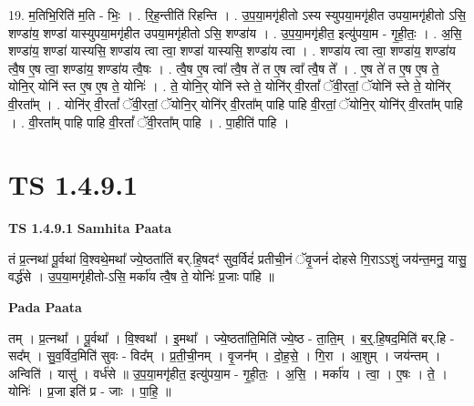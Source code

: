 \documentclass[17pt]{extarticle}
\begin{document}
19. म॒तिभि॒रिति॑ म॒ति - भिः॒ । . रि॒ह॒न्तीति॑ रिहन्ति । . उ॒प॒या॒मगृ॑हीतो ऽस्य स्युपया॒मगृ॑हीत उपया॒मगृ॑हीतो ऽसि॒ शण्डा॑य॒ शण्डा॑ यास्युपया॒मगृ॑हीत उपया॒मगृ॑हीतो ऽसि॒ शण्डा॑य । . उ॒प॒या॒मगृ॑हीत॒ इत्यु॑पया॒म - गृ॒ही॒तः॒ । . अ॒सि॒ शण्डा॑य॒ शण्डा॑ यास्यसि॒ शण्डा॑य त्वा त्वा॒ शण्डा॑ यास्यसि॒ शण्डा॑य त्वा । . शण्डा॑य त्वा त्वा॒ शण्डा॑य॒ शण्डा॑य त्वै॒ष ए॒ष त्वा॒ शण्डा॑य॒ शण्डा॑य त्वै॒षः । . त्वै॒ष ए॒ष त्वा᳚ त्वै॒ष ते॑ त ए॒ष त्वा᳚ त्वै॒ष ते᳚ । . ए॒ष ते॑ त ए॒ष ए॒ष ते॒ योनि॒र् योनि॑ स्त ए॒ष ए॒ष ते॒ योनिः॑ । . ते॒ योनि॒र् योनि॑ स्ते ते॒ योनि॑र् वी॒रतां᳚ ॅवी॒रतां॒ ॅयोनि॑ स्ते ते॒ योनि॑र् वी॒रता᳚म् । . योनि॑र् वी॒रतां᳚ ॅवी॒रतां॒ ॅयोनि॒र् योनि॑र् वी॒रता᳚म् पाहि पाहि वी॒रतां॒ ॅयोनि॒र् योनि॑र् वी॒रता᳚म् पाहि । . वी॒रता᳚म् पाहि पाहि वी॒रतां᳚ ॅवी॒रता᳚म् पाहि । . पा॒हीति॑ पाहि । \newline
\pagebreak
{}

\section{ TS 1.4.9.1 }

\textbf{TS 1.4.9.1 } \newline
\textbf{Samhita Paata} \newline

तं प्र॒त्नथा॑ पू॒र्वथा॑ वि॒श्वथे॒मथा᳚ ज्ये॒ष्ठता॑तिं बर्.हि॒षदꣳ॑ सुव॒र्विदं॑ प्रतीची॒नं ॅवृ॒जनं॑ दोहसे गि॒राऽऽशुं जय॑न्त॒मनु॒ यासु॒ वर्द्ध॑से । उ॒प॒या॒मगृ॑हीतो-ऽसि॒ मर्का॑य त्वै॒ष ते॒ योनिः॑ प्र॒जाः पा॑हि ॥ \newline

\textbf{Pada Paata} \newline

तम् । प्र॒त्नथा᳚ । पू॒र्वथा᳚ । वि॒श्वथा᳚ । इ॒मथा᳚ । ज्ये॒ष्ठता॑ति॒मिति॑ ज्ये॒ष्ठ - ता॒ति॒म् । ब॒र्॒.हि॒षद॒मिति॑ बर्.हि - सद᳚म् । सु॒व॒र्विद॒मिति॑ सुवः - विद᳚म् । प्र॒ती॒ची॒नम् । वृ॒जन᳚म् । दो॒ह॒से॒ । गि॒रा । आ॒शुम् । जय॑न्तम् । अन्विति॑ । यासु॑ । वर्ध॑से ॥ उ॒प॒या॒मगृ॑हीत॒ इत्यु॑पया॒म - गृ॒ही॒तः॒ । अ॒सि॒ । मर्का॑य । त्वा॒ । ए॒षः । ते॒ । योनिः॑ । प्र॒जा इति॑ प्र - जाः । पा॒हि॒ ॥  \newline
\end{document}
